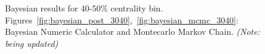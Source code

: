 \begin{figure}[hbtp]
  \begin{center}
    \caption{Bayesian results for 40-50\% centrality bin. Figures~\ref{fig:bayesian_post_3040},~\ref{fig:bayesian_mcmc_3040}: Bayesian Numeric Calculator and Montecarlo Markov Chain. %
\emph{(Note: being updated)}
}
    \label{fig:bayesian}
  \end{center}
\end{figure}




